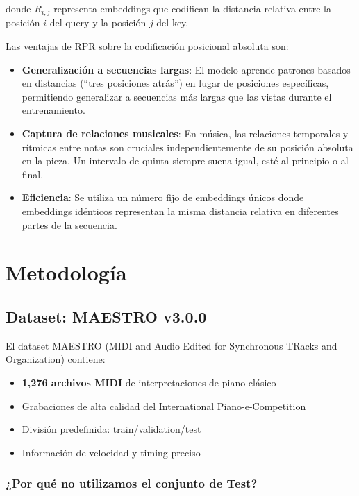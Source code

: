 \documentclass[12pt,a4paper]{article}
\begin{document}
donde $R_{i,j}$ representa embeddings que codifican la distancia relativa entre la posición $i$ del query y la posición $j$ del key.

Las ventajas de RPR sobre la codificación posicional absoluta son:

\begin{itemize}
    \item \textbf{Generalización a secuencias largas}: El modelo aprende patrones basados en distancias (``tres posiciones atrás'') en lugar de posiciones específicas, permitiendo generalizar a secuencias más largas que las vistas durante el entrenamiento.
    \item \textbf{Captura de relaciones musicales}: En música, las relaciones temporales y rítmicas entre notas son cruciales independientemente de su posición absoluta en la pieza. Un intervalo de quinta siempre suena igual, esté al principio o al final.
    \item \textbf{Eficiencia}: Se utiliza un número fijo de embeddings únicos donde embeddings idénticos representan la misma distancia relativa en diferentes partes de la secuencia.
\end{itemize}

\section{Metodología}

\subsection{Dataset: MAESTRO v3.0.0}
El dataset MAESTRO (MIDI and Audio Edited for Synchronous TRacks and Organization) \cite{hawthorne2018maestro} contiene:
\begin{itemize}
    \item \textbf{1,276 archivos MIDI} de interpretaciones de piano clásico
    \item Grabaciones de alta calidad del International Piano-e-Competition
    \item División predefinida: train/validation/test
    \item Información de velocidad y timing preciso
\end{itemize}

\subsubsection{¿Por qué no utilizamos el conjunto de Test?}
\end{document}
